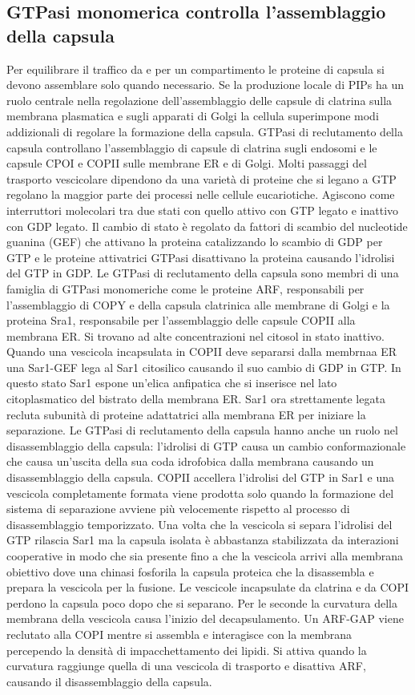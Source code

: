 \subsection{GTPasi monomerica controlla l'assemblaggio della capsula}
Per equilibrare il traffico da e per un compartimento le proteine di capsula si devono assemblare solo quando necessario. Se la produzione locale di PIPs ha un ruolo centrale nella
regolazione dell'assemblaggio delle capsule di clatrina sulla membrana plasmatica e sugli apparati di Golgi la cellula superimpone modi addizionali di regolare la formazione della
capsula. GTPasi di reclutamento della capsula controllano l'assemblaggio di capsule di clatrina sugli endosomi e le capsule CPOI e COPII sulle membrane ER e di Golgi. Molti passaggi
del trasporto vescicolare dipendono da una variet\`a di proteine che si legano a GTP regolano la maggior parte dei processi nelle cellule eucariotiche. Agiscono come interruttori 
molecolari tra due stati con quello attivo con GTP legato e inattivo con GDP legato. Il cambio di stato \`e regolato da fattori di scambio del nucleotide guanina (GEF) che attivano la
proteina catalizzando lo scambio di GDP per GTP e le proteine attivatrici GTPasi disattivano la proteina causando l'idrolisi del GTP in GDP. Le GTPasi di reclutamento della capsula
sono membri di una famiglia di GTPasi monomeriche come le proteine ARF, responsabili per l'assemblaggio di COPY e della capsula clatrinica alle membrane di Golgi e la proteina Sra1, 
responsabile per l'assemblaggio delle capsule COPII alla membrana ER. Si trovano ad alte concentrazioni nel citosol in stato inattivo. Quando una vescicola incapsulata in COPII deve
separarsi dalla membrnaa ER una Sar1-GEF lega al Sar1 citosilico causando il suo cambio di GDP in GTP. In questo stato Sar1 espone un'elica anfipatica che si inserisce nel lato
citoplasmatico del bistrato della membrana ER. Sar1 ora strettamente legata recluta subunit\`a di proteine adattatrici alla membrana ER per iniziare la separazione. Le GTPasi
di reclutamento della capsula hanno anche un ruolo nel disassemblaggio della capsula: l'idrolisi di GTP causa un cambio conformazionale che causa un'uscita della sua coda idrofobica
dalla membrana causando un disassemblaggio della capsula. COPII accellera l'idrolisi del GTP in Sar1 e una vescicola completamente formata viene prodotta solo quando la formazione
del sistema di separazione avviene pi\`u velocemente rispetto al processo di disassemblaggio temporizzato. Una volta che la vescicola si separa l'idrolisi del GTP rilascia Sar1 ma
la capsula isolata \`e abbastanza stabilizzata da interazioni cooperative in modo che sia presente fino a che la vescicola arrivi alla membrana obiettivo dove una chinasi fosforila
la capsula proteica che la disassembla e prepara la vescicola per la fusione. Le vescicole incapsulate da clatrina e da COPI perdono la capsula poco dopo che si separano. Per le seconde
la curvatura della membrana della vescicola causa l'inizio del decapsulamento. Un ARF-GAP viene reclutato alla COPI mentre si assembla e interagisce con la membrana percependo 
la densit\`a di impacchettamento dei lipidi. Si attiva quando la curvatura raggiunge quella di una vescicola di trasporto e disattiva ARF, causando il disassemblaggio della capsula.
